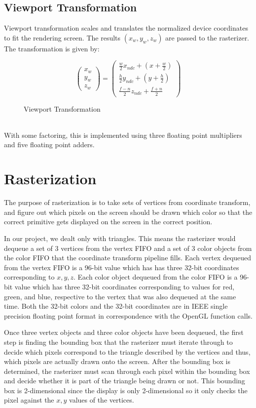 \documentclass[letterpaper,10pt]{article}
\begin{document}
\subsection{Viewport Transformation}
Viewport transformation scales and translates the normalized device coordinates to fit the rendering screen. The results $(x_{w},y_{w},z_{w})$ are passed to the rasterizer. The transformation is given by: \\
\begin{figure}[h!]
\[
\begin{pmatrix}
x_{w} \\
y_{w} \\
z_{w}
\end{pmatrix}
=
\begin{pmatrix}
\frac{w}{2}x_{ndc}+(x+\frac{w}{2}) \\
\frac{h}{2}y_{ndc}+(y+\frac{h}{2})  \\
\frac{f-n}{2}z_{ndc}+\frac{f+n}{2}
\end{pmatrix}
\]
\caption{Viewport Transformation}
\end{figure}\\	
With some factoring, this is implemented using three floating point multipliers and five floating point adders.


\section{Rasterization}

The purpose of rasterization is to take sets of vertices from coordinate transform, and figure out which pixels on the screen should be drawn which color so that the correct primitive gets displayed on the screen in the correct position. 

In our project, we dealt only with triangles. This means the rasterizer would dequeue a set of 3 vertices from the vertex FIFO and a set of 3 color objects from the color FIFO that the coordinate transform pipeline fills. Each vertex dequeued from the vertex FIFO is a 96-bit value which has has three 32-bit coordinates corresponding to $x, y, z$. Each color object dequeued from the color FIFO is a 96-bit value which has three 32-bit coordinates corresponding to values for red, green, and blue, respective to the vertex that was also dequeued at the same time. Both the 32-bit colors and the 32-bit coordinates are in IEEE single precision floating point format in correspondence with the OpenGL function calls.

Once three vertex objects and three color objects have been dequeued, the first step is finding the bounding box that the rasterizer must iterate through to decide which pixels correspond to the triangle described by the vertices and thus, which pixels are actually drawn onto the screen. After the bounding box is determined, the rasterizer must scan through each pixel within the bounding box and decide whether it is part of the triangle being drawn or not. This bounding box is 2-dimensional since the display is only 2-dimensional so it only checks the pixel against the $x, y$ values of the vertices. 
\end{document}
